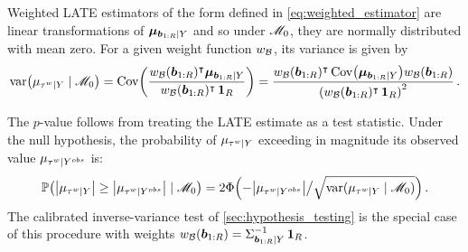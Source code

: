\begin{appendices}
Weighted LATE estimators of the form defined in \autoref{eq:weighted_estimator} are linear transformations of \(\bm{\mu}_{\bm{b}_{1:R} \mid Y}\) and so under \(\mathscr{M}_0\), they are normally distributed with mean zero.
For a given weight function \(w_{\mathcal{B}}\), its variance is given by
\begin{equation}
        \var\del{\mu_{\tauw \mid Y} \mid \modnull} = \cov\del{ \frac{\weightb(\sentinels)\trans \muvec_{\sentinels \mid Y}}{ \weightb(\sentinels)\trans\ones_{\numsent}}}
        = \frac{\weightb(\sentinels) \trans \cov \del{\muvec_{\sentinels \mid Y}} \weightb(\sentinels)}{\del{ \weightb(\sentinels)\trans\ones_{\numsent}}^2}
        \,.
\end{equation}

The \(p\)-value follows from treating the LATE estimate as a test statistic.
Under the null hypothesis, the probability of \(\mu_{\tau^{w} \mid Y}\) exceeding in magnitude its observed value \(\mu_{\tau^{w} \mid Y^{obs}}\) is:
\begin{equation}
    \Pr\del{ \abs{\mu_{\tauw \mid Y}} \ge \abs{\mu_{\tauw \mid Y^{obs}}} \mid \modnull} = 2 \Phi\del{ -\abs{\mu_{\tauw \mid Y^{obs}}} \big/ {\sqrt{\var({\mu_{\tauw \mid Y} \mid \modnull})}} }\,.
\end{equation}
The calibrated inverse-variance test of \autoref{sec:hypothesis_testing} is the special case of this procedure with weights \(w_{\mathcal{B}}(\bm{b}_{1:R}) = \Sigma^{-1}_{\bm{b}_{1:R} \mid Y} \operatorname{\mathbf{1}}_{R}\).

\end{appendices}
